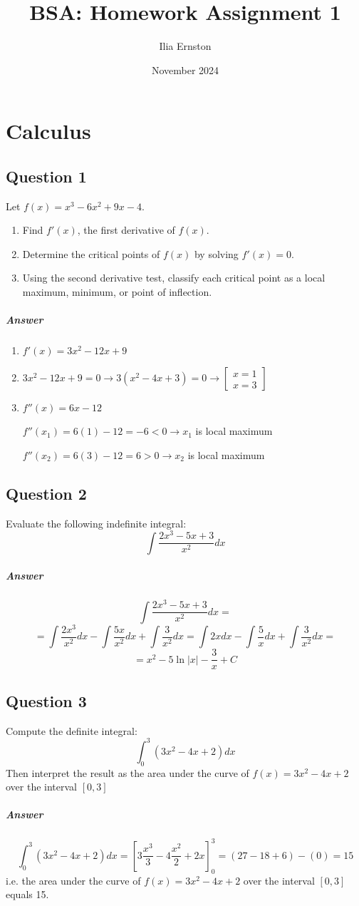 \documentclass{article}
\title{BSA: Homework Assignment 1}
\author{Ilia Ernston}
\date{November 2024}
\begin{document}
\maketitle

\section{Calculus}
\subsection{Question 1}
Let $ f(x) = x^3 - 6x^2 + 9x - 4 $. 
\begin{enumerate}
    \item Find $ f'(x) $, the first derivative of $ f(x) $.
    \item Determine the critical points of $ f(x) $ by solving $ f'(x) = 0 $.
    \item Using the second derivative test, classify each critical point as a local maximum, minimum, or point of inflection.
\end{enumerate}
\subparagraph{Answer}
\begin{enumerate}
    \item $ f'(x) = 3x^2-12x+9 $
    \item $3x^2-12x+9=0 \rightarrow 3(x^2-4x+3)=0 \rightarrow \left[ \begin{array}{cc} x=1 \\ x = 3 \end{array} \right]$
    \item $f''(x)=6x-12$

$f''(x_1)=6(1)-12=-6<0 \rightarrow x_1 $ is local maximum

$f''(x_2)=6(3)-12=6>0 \rightarrow x_2 $ is local maximum
\end{enumerate}

\subsection{Question 2}
Evaluate the following indefinite integral:
$$\int \frac{2x^3 - 5x + 3}{x^2} dx $$
\subparagraph{Answer}
$$\int \frac{2x^3 - 5x + 3}{x^2} dx = $$
$$=\int \frac{2x^3}{x^2} dx -\int \frac{5x}{x^2} dx + \int \frac{3}{x^2} dx = \int 2x dx -\int \frac{5}{x} dx + \int \frac{3}{x^2}dx = $$
$$ = x^2-5\ln \left|x\right|-\frac{3}{x}+C $$

\subsection{Question 3}
Compute the definite integral:
$$ \int_0^3 (3x^2 - 4x + 2) dx $$
Then interpret the result as the area under the curve of $ f(x) = 3x^2 - 4x + 2 $ over the interval $ [0, 3] $
\subparagraph{Answer}
$$ \int_0^3 (3x^2 - 4x + 2) dx = \left[ 3 \frac{x^3}{3}-4 \frac{x^2}{2}+2x \right] ^3_0 = (27-18+6)-(0) = 15$$ 
i.e. the area under the curve of $ f(x) = 3x^2 - 4x + 2 $ over the interval $ [0, 3] $ equals 15.
\end{document}
